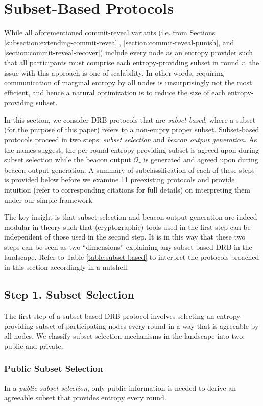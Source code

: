 \documentclass[letterpaper,twocolumn,10pt]{article}
\theoremstyle{definition}
\theoremstyle{remark}
\begin{document}
\section{Subset-Based Protocols}
\label{section:subset-based}
While all aforementioned commit-reveal variants (i.e. from Sections \ref{subsection:extending-commit-reveal}, \ref{section:commit-reveal-punish}, and \ref{section:commit-reveal-recover}) include every node as an entropy provider such that all participants must comprise each entropy-providing subset in round $r$, the issue with this approach is one of scalability. In other words, requiring communication of marginal entropy by all nodes is unsurprisingly not the most efficient, and hence a natural optimization is to reduce the size of each entropy-providing subset.

In this section, we consider DRB protocols that are \textit{subset-based}, where a subset (for the purpose of this paper) refers to a non-empty proper subset. Subset-based protocols proceed in two steps: \textit{subset selection} and \textit{beacon output generation}. As the names suggest, the per-round entropy-providing subset is agreed upon during subset selection while the beacon output $\mathcal{O}_r$ is generated and agreed upon during beacon output generation. A summary of subclassification of each of these steps is provided below before we examine 11 preexisting protocols and provide intuition (refer to corresponding citations for full details) on interpreting them under our simple framework.

The key insight is that subset selection and beacon output generation are indeed modular in theory such that (cryptographic) tools used in the first step can be independent of those used in the second step. It is in this way that these two steps can be seen as two ``dimensions'' explaining any subset-based DRB in the landscape. Refer to Table \ref{table:subset-based} to interpret the protocols broached in this section accordingly in a nutshell.

\subsection{Step 1. Subset Selection}
The first step of a subset-based DRB protocol involves selecting an entropy-providing subset of participating nodes every round in a way that is agreeable by all nodes. We classify subset selection mechanisms in the landscape into two: public and private.

\subsubsection{Public Subset Selection}
\label{subsubsection:public-subset-selection}
In a \textit{public subset selection}, only public information is needed to derive an agreeable subset that provides entropy every round.\\
\end{document}
